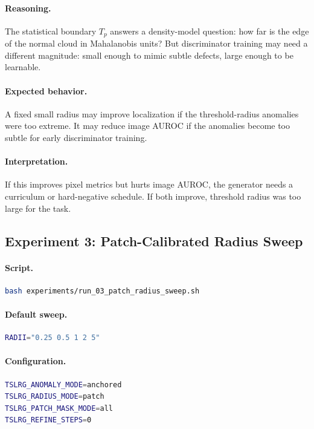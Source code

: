 \documentclass[11pt]{article}
\begin{document}
\paragraph{Reasoning.}
The statistical boundary $T_p$ answers a density-model question: how far is the
edge of the normal cloud in Mahalanobis units? But discriminator training may
need a different magnitude: small enough to mimic subtle defects, large enough
to be learnable.

\paragraph{Expected behavior.}
A fixed small radius may improve localization if the threshold-radius anomalies
were too extreme. It may reduce image AUROC if the anomalies become too subtle
for early discriminator training.

\paragraph{Interpretation.}
If this improves pixel metrics but hurts image AUROC, the generator needs a
curriculum or hard-negative schedule. If both improve, threshold radius was too
large for the task.

\subsection{Experiment 3: Patch-Calibrated Radius Sweep}

\paragraph{Script.}
\begin{lstlisting}[language=bash]
bash experiments/run_03_patch_radius_sweep.sh
\end{lstlisting}

\paragraph{Default sweep.}
\begin{lstlisting}[language=bash]
RADII="0.25 0.5 1 2 5"
\end{lstlisting}

\paragraph{Configuration.}
\begin{lstlisting}[language=bash]
TSLRG_ANOMALY_MODE=anchored
TSLRG_RADIUS_MODE=patch
TSLRG_PATCH_MASK_MODE=all
TSLRG_REFINE_STEPS=0
\end{lstlisting}
\end{document}
